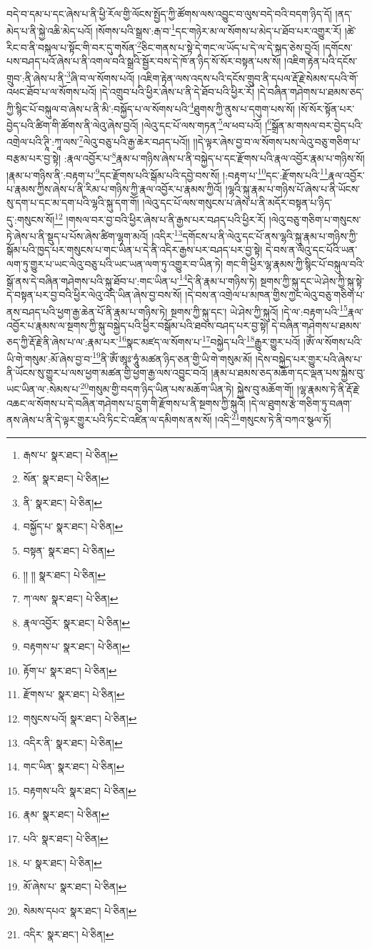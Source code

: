 བདེ་བ་དམ་པ་དང་ཞེས་པ་ནི་ཕྱི་རོལ་གྱི་ལོངས་སྤྱོད་ཀྱི་ཚོགས་ལས་འབྱུང་བ་ལུས་བདེ་བའི་བདག་ཉིད་དོ། །ནད་མེད་པ་ནི་སྐྱེ་འཆི་མེད་པའོ། །སོགས་པའི་སྒྲས་:རྒ་བ་\footnote{རྒས་པ་  སྣར་ཐང་།  པེ་ཅིན། }དང་གཉེར་མ་ལ་སོགས་པ་མེད་པ་ཐོབ་པར་འགྱུར་རོ། །ཚེ་རིང་བ་ནི་བསྐལ་པ་སྟོང་གི་བར་དུ་གསོན་\footnote{སོན་  སྣར་ཐང་།  པེ་ཅིན། }ཅིང་གནས་པ་སྟེ་དེ་གང་ལ་ཡོད་པ་དེ་ལ་དེ་སྐད་ཅེས་བྱའོ། །དགོངས་པས་བཤད་པའོ་ཞེས་པ་ནི་འགལ་བའི་སྒྲའི་སྦྱོར་བས་དེ་ཁོ་ན་ཉིད་སོ་སོར་བསྟན་པས་སོ། །འཇིག་རྟེན་པའི་དངོས་གྲུབ་:ནི་ཞེས་པ་ནི་\footnote{ནི་  སྣར་ཐང་།  པེ་ཅིན། }ཞི་བ་ལ་སོགས་པའོ། །འཇིག་རྟེན་ལས་འདས་པའི་དངོས་གྲུབ་ནི་དཔལ་རྡོ་རྗེ་སེམས་དཔའི་གོ་འཕང་ཐོབ་པ་ལ་སོགས་པའོ། །དེ་འགྲུབ་པའི་ཕྱིར་ཞེས་པ་ནི་དེ་ཐོབ་པའི་ཕྱིར་རོ། །དེ་བཞིན་གཤེགས་པ་ཐམས་ཅད་ཀྱི་སྙིང་པོ་བསྐུལ་བ་ཞེས་པ་ནི་མི་:བསྐྱོད་པ་ལ་སོགས་པའི་\footnote{བསྐྱོད་པ་  སྣར་ཐང་།  པེ་ཅིན། }ཐུགས་ཀྱི་ནུས་པ་དགུག་པས་སོ། །སོ་སོར་སྟོན་པར་བྱེད་པའི་ཚིག་གི་ཚོགས་ནི་ལེའུ་ཞེས་བྱའོ། །ལེའུ་དང་པོ་ལས་གཏན་\footnote{བསྟན་  སྣར་ཐང་།  པེ་ཅིན། }ལ་ཕབ་པའོ། །\footnote{།། །།  སྣར་ཐང་།  པེ་ཅིན། }སྒྲོན་མ་གསལ་བར་བྱེད་པའི་འགྲེལ་པའི་ཊཱི་:ཀཱ་ལས་\footnote{ཀ་ལས་  སྣར་ཐང་།  པེ་ཅིན། }ལེའུ་བཅུ་པའི་རྒྱ་ཆེར་བཤད་པའོ།། །།དེ་ལྟར་ཞེས་བྱ་བ་ལ་སོགས་པས་ལེའུ་བཅུ་གཅིག་པ་བརྩམ་པར་བྱ་སྟེ། :རྣལ་འབྱོར་པ་\footnote{རྣལ་འབྱོར་  སྣར་ཐང་།  པེ་ཅིན། }རྣམ་པ་གཉིས་ཞེས་པ་ནི་བསྐྱེད་པ་དང་རྫོགས་པའི་རྣལ་འབྱོར་རྣམ་པ་གཉིས་སོ། །རྣམ་པ་གཉིས་ནི་:བརྟག་པ་\footnote{བརྟགས་པ་  སྣར་ཐང་།  པེ་ཅིན། }དང་རྫོགས་པའི་སྒོམ་པའི་དབྱེ་བས་སོ། །:བརྟག་པ་\footnote{རྟོག་པ་  སྣར་ཐང་།  པེ་ཅིན། }དང་:རྫོགས་པའི་\footnote{རྫོགས་པ་  སྣར་ཐང་།  པེ་ཅིན། }རྣལ་འབྱོར་པ་རྣམས་ཀྱིས་ཞེས་པ་ནི་རིམ་པ་གཉིས་ཀྱི་རྣལ་འབྱོར་པ་རྣམས་ཀྱིའོ། །ལྷའི་སྐུ་རྣམ་པ་གཉིས་པོ་ཞེས་པ་ནི་ཡོངས་སུ་དག་པ་དང་མ་དག་པའི་ལྷའི་སྐུ་དག་གོ། །ལེའུ་དང་པོ་ལས་གསུངས་པ་ཞེས་པ་ནི་མདོར་བསྟན་པ་ཉིད་དུ་:གསུངས་སོ།\footnote{གསུངས་པའོ།  སྣར་ཐང་།  པེ་ཅིན། } །གསལ་བར་བྱ་བའི་ཕྱིར་ཞེས་པ་ནི་རྒྱས་པར་བཤད་པའི་ཕྱིར་རོ། །ལེའུ་བཅུ་གཅིག་པ་གསུངས་ཏེ་ཞེས་པ་ནི་སྡུད་པ་པོས་ཞེས་ཚིག་ལྷག་མའོ། །འདིར་\footnote{འདིར་ནི་  སྣར་ཐང་།  པེ་ཅིན། }དགོངས་པ་ནི་ལེའུ་དང་པོ་ནས་ལྷའི་སྐུ་རྣམ་པ་གཉིས་ཀྱི་སྒོམ་པའི་ཁྱད་པར་གསུངས་པ་གང་ཡིན་པ་དེ་ནི་འདིར་རྒྱས་པར་བཤད་པར་བྱ་སྟེ། དེ་བས་ན་ལེའུ་དང་པོའི་ཡན་ལག་ཏུ་གྱུར་པ་ཡང་ལེའུ་བཅུ་པའི་ཡང་ཡན་ལག་ཏུ་འགྱུར་བ་ཡིན་ཏེ། གང་གི་ཕྱིར་ལྷ་རྣམས་ཀྱི་སྙིང་པོ་བསྐུལ་བའི་སྒོ་ནས་དེ་བཞིན་གཤེགས་པའི་སྐུ་ཐོབ་པ་:གང་ཡིན་པ་\footnote{གང་ཡིན་  སྣར་ཐང་།  པེ་ཅིན། }དེ་ནི་རྣམ་པ་གཉིས་ཏེ། སྔགས་ཀྱི་སྐུ་དང་ཡེ་ཤེས་ཀྱི་སྐུ་སྟེ་དེ་བསྟན་པར་བྱ་བའི་ཕྱིར་ལེའུ་འདི་ཡིན་ཞེས་བྱ་བས་སོ། །དེ་བས་ན་འགྲེལ་པ་མཁན་གྱིས་ཀྱང་ལེའུ་བཅུ་གཅིག་པ་ནས་བཤད་པའི་ཕྱག་རྒྱ་ཆེན་པོ་ནི་རྣམ་པ་གཉིས་ཏེ། སྔགས་ཀྱི་སྐུ་དང་། ཡེ་ཤེས་ཀྱི་སྐུའོ། །དེ་ལ་:བརྟག་པའི་\footnote{བརྟགས་པའི་  སྣར་ཐང་།  པེ་ཅིན། }རྣལ་འབྱོར་པ་རྣམས་ལ་སྔགས་ཀྱི་སྐུ་བསྐྱེད་པའི་ཕྱིར་བསྒོམ་པའི་ཐབས་བཤད་པར་བྱ་སྟེ། དེ་བཞིན་གཤེགས་པ་ཐམས་ཅད་ཀྱི་རྡོ་རྗེ་ནི་ཞེས་པ་ལ་:རྣམ་པར་\footnote{རྣམ་  སྣར་ཐང་།  པེ་ཅིན། }སྣང་མཛད་ལ་སོགས་པ་\footnote{པའི་  སྣར་ཐང་།  པེ་ཅིན། }བསྐྱེད་པའི་\footnote{པ་  སྣར་ཐང་།  པེ་ཅིན། }རྒྱུར་གྱུར་པའོ། །ཨོཾ་ལ་སོགས་པའི་ཡི་གེ་གསུམ་:མོ་ཞེས་བྱ་བ་\footnote{མོ་ཞེས་པ་  སྣར་ཐང་།  པེ་ཅིན། }ནི་ཨོཾ་ཨཱཿ་ཧཱུཾ་མཚན་ཉིད་ཅན་གྱི་ཡི་གེ་གསུམ་མོ། །དེས་བསྐྱེད་པར་གྱུར་པའི་ཞེས་པ་ནི་ཡོངས་སུ་གྱུར་པ་ལས་ཕྱག་མཚན་གྱི་ཕྱག་རྒྱ་ལས་འབྱུང་བའོ། །རྣམ་པ་ཐམས་ཅད་མཆོག་དང་ལྡན་པས་སྐྱེས་བུ་ཡང་ཡིན་ལ་:སེམས་པ་\footnote{སེམས་དཔའ་  སྣར་ཐང་།  པེ་ཅིན། }གསུམ་གྱི་བདག་ཉིད་ཡིན་པས་མཆོག་ཡིན་ཏེ། སྐྱེས་བུ་མཆོག་གོ། །ལྷ་རྣམས་ཏེ་ནི་རྡོ་རྗེ་འཆང་ལ་སོགས་པ་དེ་བཞིན་གཤེགས་པ་དྲུག་གི་རྫོགས་པ་ནི་སྔགས་ཀྱི་སྐུའོ། །དེ་ལ་ཐུགས་རྩེ་གཅིག་ཏུ་བཞག་ནས་ཞེས་པ་ནི་དེ་ལྟར་གྱུར་པའི་ཏིང་ངེ་འཛིན་ལ་དམིགས་ནས་སོ། །འདི་\footnote{འདིར་  སྣར་ཐང་།  པེ་ཅིན། }གསུངས་ཏེ་ནི་བཀའ་སྩལ་ཏོ། 